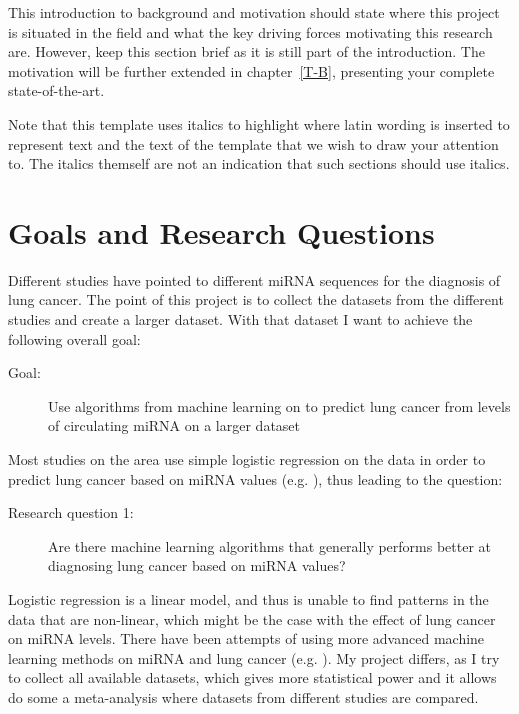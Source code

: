 This introduction to background and motivation should state where this project is situated in the field and what the key driving forces motivating this research are. However, keep this section brief as it is still part of the introduction. The motivation will be further extended in chapter~\ref{T-B}, presenting your complete state-of-the-art. 

Note that this template uses italics to highlight where latin wording is inserted to represent text and the text of the template that we wish to draw your attention to. The italics themself are not an indication that such sections should use italics.  
\fi

\section{Goals and Research Questions}
\label{sec:Goals and Research Questions}


Different studies have pointed to different miRNA sequences for the diagnosis of lung cancer. The point of this project is to collect the datasets from the different studies and create a larger dataset. With that dataset I want to achieve the following overall goal:

\begin{description}
\item[Goal:] Use algorithms from machine learning on to predict lung cancer from levels of circulating miRNA on a larger dataset
\end{description}

Most studies on the area use simple logistic regression on the data in order to predict lung cancer based on miRNA values (e.g. \citep{wozniak2015,niu2019}), thus leading to the question:

\begin{description}
\item[Research question 1:] Are there machine learning algorithms that generally performs better at diagnosing lung cancer based on miRNA values?
\end{description}

Logistic regression is a linear model, and thus is unable to find patterns in the data that are non-linear, which might be the case with the effect of lung cancer on miRNA levels. There have been attempts of using more advanced machine learning methods on miRNA and lung cancer (e.g. \citep{maskinrna}). My project differs, as I try to collect all available datasets, which gives more statistical power and it allows do some a meta-analysis where datasets from different studies are compared.

